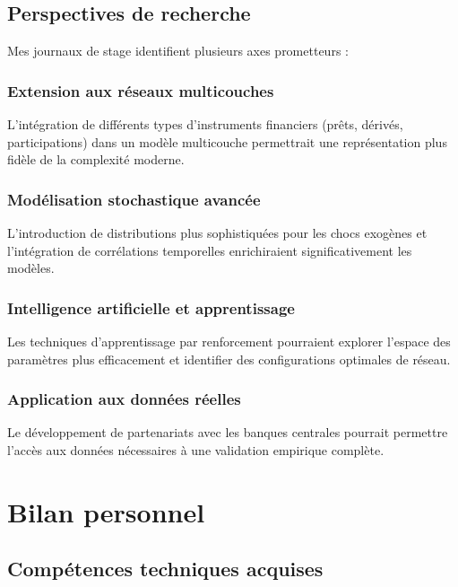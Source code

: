 \documentclass[12pt,a4paper,twoside]{article}
\begin{document}
\subsection{Perspectives de recherche}

Mes journaux de stage identifient plusieurs axes prometteurs :

\subsubsection{Extension aux réseaux multicouches}

L'intégration de différents types d'instruments financiers (prêts, dérivés, participations) dans un modèle multicouche permettrait une représentation plus fidèle de la complexité moderne.

\subsubsection{Modélisation stochastique avancée}

L'introduction de distributions plus sophistiquées pour les chocs exogènes et l'intégration de corrélations temporelles enrichiraient significativement les modèles.

\subsubsection{Intelligence artificielle et apprentissage}

Les techniques d'apprentissage par renforcement pourraient explorer l'espace des paramètres plus efficacement et identifier des configurations optimales de réseau.

\subsubsection{Application aux données réelles}

Le développement de partenariats avec les banques centrales pourrait permettre l'accès aux données nécessaires à une validation empirique complète.

\section{Bilan personnel}

\subsection{Compétences techniques acquises}
\end{document}
